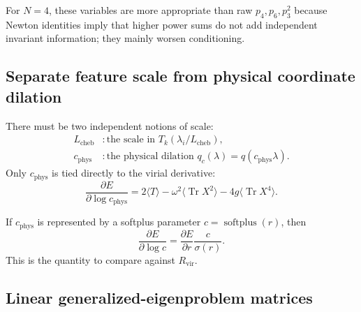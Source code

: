 \documentclass[11pt]{article}
\newcommand{\Tr}{\operatorname{Tr}}
\newcommand{\Rvir}{R_{\mathrm{vir}}}
\begin{document}
For \(N=4\), these variables are more appropriate than raw \(p_4,p_6,p_3^2\) because Newton identities imply that higher power sums do not add independent invariant information; they mainly worsen conditioning.

\subsection{Separate feature scale from physical coordinate dilation}

There must be two independent notions of scale:
\begin{align}
L_{\mathrm{cheb}} &: \text{the scale in } T_k(\lambda_i/L_{\mathrm{cheb}}),\\
c_{\mathrm{phys}} &: \text{the physical dilation }q_c(\lambda)=q(c_{\mathrm{phys}}\lambda).
\end{align}
Only \(c_{\mathrm{phys}}\) is tied directly to the virial derivative:
\begin{equation}
\frac{\partial E}{\partial\log c_{\mathrm{phys}}}=
2\langle T\rangle-
\omega^2\langle\Tr X^2\rangle-
4g\langle\Tr X^4\rangle.
\end{equation}

If \(c_{\mathrm{phys}}\) is represented by a softplus parameter \(c=\operatorname{softplus}(r)\), then
\begin{equation}
\frac{\partial E}{\partial\log c}
=
\frac{\partial E}{\partial r}\frac{c}{\sigma(r)}.
\end{equation}
This is the quantity to compare against \(\Rvir\).

\subsection{Linear generalized-eigenproblem matrices}
\end{document}
